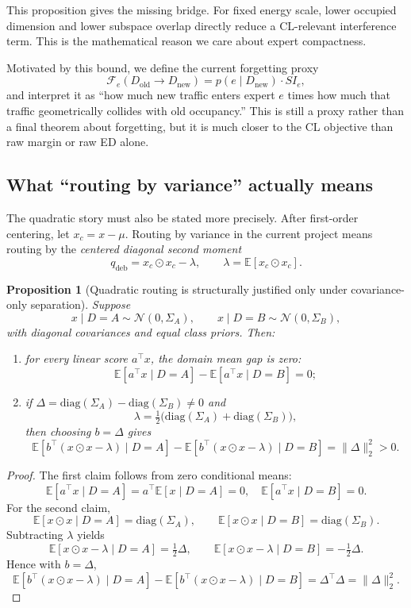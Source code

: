 \documentclass[11pt]{article}
\newtheorem{proposition}{Proposition}
\begin{document}
This proposition gives the missing bridge. For fixed energy scale, lower occupied dimension and lower subspace overlap directly reduce a CL-relevant interference term. This is the mathematical reason we care about expert compactness.

Motivated by this bound, we define the current forgetting proxy
\[
\mathcal{F}_e(D_{\mathrm{old}}\!\to\! D_{\mathrm{new}})
=
p(e\mid D_{\mathrm{new}})
\cdot
SI_e,
\]
and interpret it as ``how much new traffic enters expert $e$ times how much that traffic geometrically collides with old occupancy.'' This is still a proxy rather than a final theorem about forgetting, but it is much closer to the CL objective than raw margin or raw ED alone.

\subsection{What ``routing by variance'' actually means}

The quadratic story must also be stated more precisely. After first-order centering, let $x_c=x-\mu$. Routing by variance in the current project means routing by the \emph{centered diagonal second moment}
\[
q_{\mathrm{deb}} = x_c \odot x_c - \lambda,
\qquad
\lambda = \mathbb{E}[x_c \odot x_c].
\]

\begin{proposition}[Quadratic routing is structurally justified only under covariance-only separation]
Suppose
\[
x\mid D=A \sim \mathcal{N}(0,\Sigma_A),
\qquad
x\mid D=B \sim \mathcal{N}(0,\Sigma_B),
\]
with diagonal covariances and equal class priors. Then:
\begin{enumerate}
    \item for every linear score $a^\top x$, the domain mean gap is zero:
    \[
    \mathbb{E}[a^\top x\mid D=A]-\mathbb{E}[a^\top x\mid D=B]=0;
    \]
    \item if $\Delta=\mathrm{diag}(\Sigma_A)-\mathrm{diag}(\Sigma_B)\neq 0$ and
    \[
    \lambda=\tfrac12\big(\mathrm{diag}(\Sigma_A)+\mathrm{diag}(\Sigma_B)\big),
    \]
    then choosing $b=\Delta$ gives
    \[
    \mathbb{E}[b^\top(x\odot x-\lambda)\mid D=A]
    -
    \mathbb{E}[b^\top(x\odot x-\lambda)\mid D=B]
    =
    \|\Delta\|_2^2 > 0.
    \]
\end{enumerate}
\end{proposition}

\begin{proof}
The first claim follows from zero conditional means:
\[
\mathbb{E}[a^\top x\mid D=A]=a^\top \mathbb{E}[x\mid D=A]=0,
\quad
\mathbb{E}[a^\top x\mid D=B]=0.
\]
For the second claim,
\[
\mathbb{E}[x\odot x\mid D=A]=\mathrm{diag}(\Sigma_A),
\qquad
\mathbb{E}[x\odot x\mid D=B]=\mathrm{diag}(\Sigma_B).
\]
Subtracting $\lambda$ yields
\[
\mathbb{E}[x\odot x-\lambda\mid D=A]=\tfrac12\Delta,
\qquad
\mathbb{E}[x\odot x-\lambda\mid D=B]=-\tfrac12\Delta.
\]
Hence with $b=\Delta$,
\[
\mathbb{E}[b^\top(x\odot x-\lambda)\mid D=A]
-
\mathbb{E}[b^\top(x\odot x-\lambda)\mid D=B]
=
\Delta^\top \Delta
=
\|\Delta\|_2^2.
\]
\end{proof}
\end{document}
